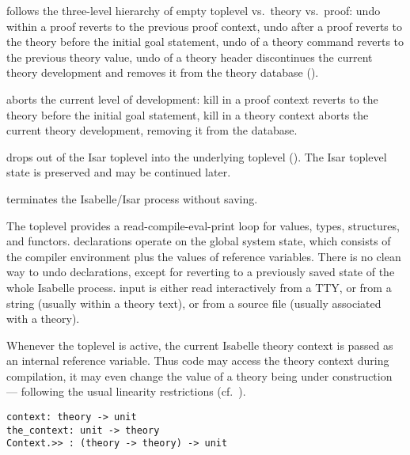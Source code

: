 \begin{isabellebody}
\begin{isamarkuptext}
\begin{description}
  \item {} follows the three-level hierarchy of empty
  toplevel vs.\ theory vs.\ proof: undo within a proof reverts to the
  previous proof context, undo after a proof reverts to the theory
  before the initial goal statement, undo of a theory command reverts
  to the previous theory value, undo of a theory header discontinues
  the current theory development and removes it from the theory
  database ().

  \item {} aborts the current level of development:
  kill in a proof context reverts to the theory before the initial
  goal statement, kill in a theory context aborts the current theory
  development, removing it from the database.

  \item {} drops out of the Isar toplevel into the
  underlying {\ML} toplevel ().  The Isar
  toplevel state is preserved and may be continued later.

  \item {} terminates the Isabelle/Isar process without
  saving.

  \end{description}%
\end{isamarkuptext}%
\isamarkuptrue%
%
\isamarkuptrue%
%
\begin{isamarkuptext}%
The {\ML} toplevel provides a read-compile-eval-print loop for
  {\ML} values, types, structures, and functors.  {\ML} declarations
  operate on the global system state, which consists of the compiler
  environment plus the values of {\ML} reference variables.  There is
  no clean way to undo {\ML} declarations, except for reverting to a
  previously saved state of the whole Isabelle process.  {\ML} input
  is either read interactively from a TTY, or from a string (usually
  within a theory text), or from a source file (usually associated
  with a theory).

  Whenever the {\ML} toplevel is active, the current Isabelle theory
  context is passed as an internal reference variable.  Thus {\ML}
  code may access the theory context during compilation, it may even
  change the value of a theory being under construction --- following
  the usual linearity restrictions (cf.~).%
\end{isamarkuptext}%
\isamarkuptrue%
%
\isadelimmlref
%
\endisadelimmlref
%
\isatagmlref
%
\begin{isamarkuptext}%
\begin{mldecls}
  \verb|context: theory -> unit| \\
  \verb|the_context: unit -> theory| \\
  \verb|Context.>> : (theory -> theory) -> unit| \\
  \end{mldecls}


\end{isamarkuptext}
\end{isabellebody}
